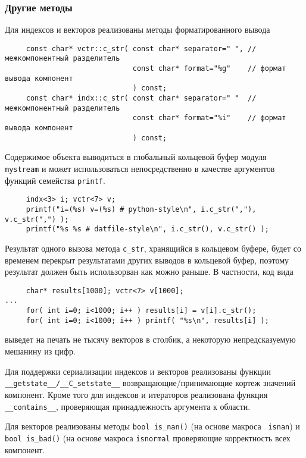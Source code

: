\subsubsection{Другие методы}
Для индексов и векторов реализованы методы форматированного вывода
\begin{verbatim}
     const char* vctr::c_str( const char* separator=" ", // межкомпонентный разделитель
                              const char* format="%g"    // формат вывода компонент
                              ) const;
     const char* indx::c_str( const char* separator=" "  // межкомпонентный разделитель
                              const char* format="%i"    // формат вывода компонент
                              ) const;
\end{verbatim}
Содержимое объекта выводиться в глобальный кольцевой буфер модуля {\tt
  mystream} и может использоваться
непосредственно в качестве аргументов функций семейства {\tt printf}.
\begin{verbatim}
     indx<3> i; vctr<7> v;
     printf("i=(%s) v=(%s) # python-style\n", i.c_str(","), v.c_str(",") );
     printf("%s %s # datfile-style\n", i.c_str(), v.c_str() );
\end{verbatim}
Результат одного вызова метода {\tt c\_str}, хранящийся в кольцевом буфере, будет со
временем перекрыт результатами других выводов в кольцевой буфер, поэтому
результат должен быть использорван как можно раньше. В частности, код вида
\begin{verbatim}
     char* results[1000]; vctr<7> v[1000];
...
     for( int i=0; i<1000; i++ ) results[i] = v[i].c_str();
     for( int i=0; i<1000; i++ ) printf( "%s\n", results[i] );
\end{verbatim}
выведет на печать не тысячу векторов в столбик, а некоторую непредсказуемую
мешанину из цифр.

Для поддержки сериализации индексов и векторов реализованы функции {\tt
  \_\_getstate\_\_/\_\_С\_setstate\_\_} возвращающие/принимающие кортеж значений
компонент.
Кроме того для индексов и итераторов реализована функция {\tt
  \_\_contains\_\_}, проверяющая принадлежность аргумента к области.

Для векторов реализованы методы {\tt bool is\_nan()} (на основе макроса {\tt
  isnan}) и {\tt bool is\_bad()} (на основе макроса {\tt isnormal}
проверяющие корректность всех компонент. 


